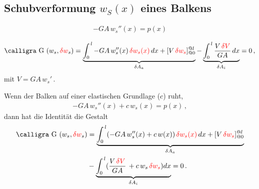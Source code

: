 {{{{{\textcolor{sectionTitleBlue}{\subsection{Schubverformung $w_S(x)$ eines Balkens}}}
\vspace{-0.7cm}
\begin{align}
- GA\,w_s''(x) = p(x)
\end{align}

\begin{align}
\text{\normalfont\calligra G\,\,}(w_s,\textcolor{red}{\delta w}_s) = \underbrace{\int_0^{\,l} - GA\,w_s''(x)\,\textcolor{red}{\delta w_s(x)}\,dx + [V\,\textcolor{red}{\delta w_s}]_{@0}^{@l}}_{\delta A_a} - \underbrace{\int_0^{\,l} \frac{V\,\textcolor{red}{\delta V}}{GA}\,dx}_{\delta A_i} = 0\,,
\end{align}
mit $V = GA\,w_s'$\,.

Wenn der Balken auf einer elastischen Grundlage ($c$) ruht,
\begin{align}
- GA\,w_s''(x) + c\,w_s(x) = p(x)\,,
\end{align}
dann hat die Identit\"{a}t die Gestalt
\begin{align}
\text{\normalfont\calligra G\,\,}(w_s,\textcolor{red}{\delta w}_s) &= \underbrace{\int_0^{\,l} (- GA\,w_s''(x) + c\,w(x))\,\textcolor{red}{\delta w_s(x)}\,dx + [V\,\textcolor{red}{\delta w_s}]_{@0}^{@l}}_{\delta A_a}\nn \\
 &- \underbrace{\int_0^{\,l} (\frac{V\,\textcolor{red}{\delta V}}{GA}\, +c\,w_s\,\textcolor{red}{\delta w_s}) dx}_{\delta A_i} = 0\,.
\end{align}

}}}}
